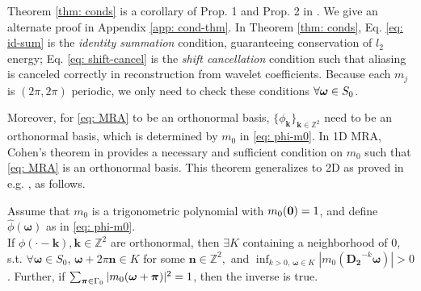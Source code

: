 Theorem \ref{thm: conds} is a corollary of Prop. 1 and Prop. 2 in \cite{durand2007}. We give an alternate proof in Appendix \ref{app: cond-thm}.
In Theorem \ref{thm: conds}, Eq. \eqref{eq: id-sum} is the {\it identity summation} condition, guaranteeing conservation of $l_2$ energy; Eq. \eqref{eq: shift-cancel} is the {\it shift cancellation} condition such that aliasing is canceled correctly in reconstruction from wavelet coefficients. %
Because each $m_j$ is $(2\pi,2\pi)$ periodic, we only need to check these conditions $\forall \boldsymbol{\omega}\in S_0$.

Moreover, for  \eqref{eq: MRA} to be an orthonormal basis,  $\{\phi_{\boldsymbol{k}}\}_{\boldsymbol{k}\in\mathbb{Z}^2}$ need to be an orthonormal basis, which is determined by $m_0$ in \eqref{eq: phi-m0}. In 1D MRA, Cohen's theorem in \cite{cohen1992biorthogonal} provides a necessary and sufficient condition on $m_0$ such that \eqref{eq: MRA} is an orthonormal basis. %
This theorem generalizes to 2D as proved in  e.g. \cite{yin2014orthshear}, as follows.
\begin{thm}\label{thm: basis cond}
Assume that $m_0$ is a trigonometric polynomial with $m_0(\boldsymbol{0})=1$, and define $\hat{\phi}(\boldsymbol{\omega})$ as in \eqref{eq: phi-m0}.\\
If $\phi(\cdot - \boldsymbol{k}),\boldsymbol{k}\in\mathbb{Z}^2$ are orthonormal, then $\exists K$ containing a neighborhood of 0, s.t. $\forall\boldsymbol{\omega}\in S_0,\,\boldsymbol{\omega}+2\pi\mathbf{n}\in K$ for some $\mathbf{n}\in\mathbb{Z}^2, $ and $\inf_{k>0,\,\boldsymbol{\omega}\in K}|m_0(\mathbf{D_2}^{-k}\boldsymbol{\omega})| >0$. 
 Further, if $\sum_{\boldsymbol{\boldsymbol{\pi}}\in \Gamma_0} |m_0(\boldsymbol{\omega}+\boldsymbol{\pi})|^2 = 1$, then the inverse is true.
\end{thm}

